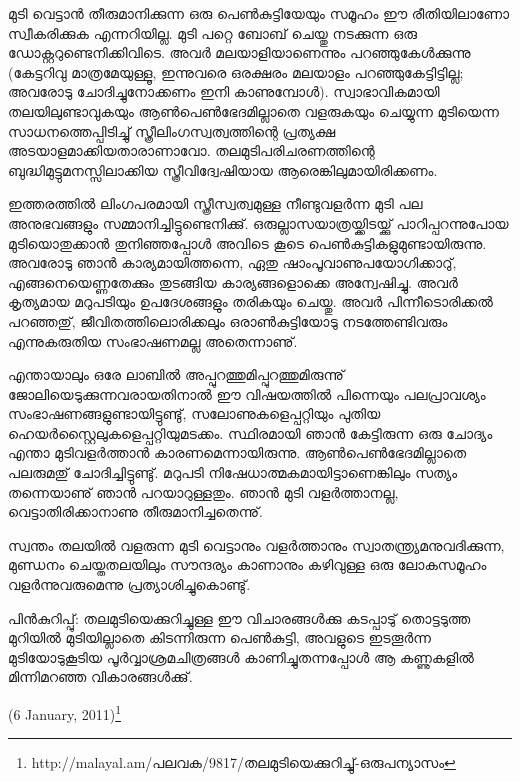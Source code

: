 മുടി വെട്ടാന്‍ തീരുമാനിക്കുന്ന ഒരു പെണ്‍കുട്ടിയേയും സമൂഹം ഈ രീതിയിലാണോ സ്വീകരിക്കുക എന്നറിയില്ല. മുടി പറ്റെ 
ബോബ് ചെയ്തു നടക്കുന്ന ഒരു ഡോക്റ്ററുണ്ടെനിക്കിവിടെ. അവര്‍ മലയാളിയാണെന്നും പറഞ്ഞുകേള്‍ക്കുന്നു (കേട്ടറിവു മാത്രമേയുള്ളൂ, 
ഇന്നുവരെ ഒരക്ഷരം മലയാളം പറഞ്ഞുകേട്ടിട്ടില്ല; അവരോടു ചോദിച്ചുനോക്കണം ഇനി കാണുമ്പോള്‍). സ്വാഭാവികമായി 
തലയിലുണ്ടാവുകയും ആണ്‍പെണ്‍ഭേദമില്ലാതെ വളരുകയും ചെയ്യുന്ന മുടിയെന്ന സാധനത്തെപ്പിടിച്ചു് 
സ്ത്രീലിംഗസ്വത്വത്തിന്റെ പ്രത്യക്ഷ അടയാളമാക്കിയതാരാണാവോ. തലമുടിപരിചരണത്തിന്റെ ബുദ്ധിമുട്ടുമനസ്സിലാക്കിയ സ്ത്രീവിദ്വേഷിയായ ആരെങ്കിലുമായിരിക്കണം.

ഇത്തരത്തില്‍ ലിംഗപരമായി സ്ത്രീസ്വത്വമുള്ള നീണ്ടുവളര്‍ന്ന മുടി പല അനുഭവങ്ങളും സമ്മാനിച്ചിട്ടുണ്ടെനിക്കു്. 
ഒരുല്ലാസയാത്രയ്ക്കിടയ്ക്കു് പാറിപ്പറന്നുപോയ മുടിയൊതുക്കാന്‍ തുനിഞ്ഞപ്പോള്‍ അവിടെ കൂടെ 
പെണ്‍കുട്ടികളുമുണ്ടായിരുന്നു. അവരോടു ഞാന്‍ കാര്യമായിത്തന്നെ, ഏതു ഷാംപൂവാണുപയോഗിക്കാറു്, എങ്ങനെയെണ്ണതേക്കും 
തുടങ്ങിയ കാര്യങ്ങളൊക്കെ അന്വേഷിച്ചു. അവര്‍ കൃത്യമായ മറുപടിയും ഉപദേശങ്ങളും തരികയും ചെയ്തു. അവര്‍ പിന്നീടൊരിക്കല്‍ പറഞ്ഞതു്, 
ജീവിതത്തിലൊരിക്കലും ഒരാണ്‍കുട്ടിയോടു നടത്തേണ്ടിവരും എന്നുകരുതിയ സംഭാഷണമല്ല അതെന്നാണു്.

എന്തായാലും ഒരേ ലാബില്‍ അപ്പുറത്തുമിപ്പുറത്തുമിരുന്നു് ജോലിയെടുക്കുന്നവരായതിനാല്‍ ഈ വിഷയത്തില്‍ പിന്നെയും 
പലപ്രാവശ്യം സംഭാഷണങ്ങളുണ്ടായിട്ടുണ്ടു്, സലോണുകളെപ്പറ്റിയും പുതിയ ഹെയര്‍സ്റ്റൈലുകളെപ്പറ്റിയുമടക്കം. 
സ്ഥിരമായി ഞാന്‍ കേട്ടിരുന്ന ഒരു ചോദ്യം എന്താ മുടിവളര്‍ത്താന്‍ കാരണമെന്നായിരുന്നു. ആണ്‍പെണ്‍ഭേദമില്ലാതെ 
പലരുമതു് ചോദിച്ചിട്ടുണ്ടു്. മറുപടി നിഷേധാത്മകമായിട്ടാണെങ്കിലും സത്യം തന്നെയാണു് ഞാന്‍ പറയാറുള്ളതും. ഞാന്‍ മുടി 
വളര്‍ത്താനല്ല, വെട്ടാതിരിക്കാനാണു തീരുമാനിച്ചതെന്നു്.

സ്വന്തം തലയില്‍ വളരുന്ന മുടി വെട്ടാനും വളര്‍ത്താനും സ്വാതന്ത്ര്യമനുവദിക്കുന്ന, മുണ്ഡനം ചെയ്തതലയിലും 
സൗന്ദര്യം കാണാനും കഴിവുള്ള ഒരു ലോകസമൂഹം വളര്‍ന്നുവരുമെന്നു പ്രത്യാശിച്ചുകൊണ്ടു്.

പിന്‍കുറിപ്പു്: തലമുടിയെക്കുറിച്ചുള്ള ഈ വിചാരങ്ങള്‍ക്കു കടപ്പാടു് തൊട്ടടുത്ത മുറിയില്‍ മുടിയില്ലാതെ കിടന്നിരുന്ന പെണ്‍കുട്ടി, അവളുടെ ഇടതൂര്‍ന്ന മുടിയോടുകൂടിയ പൂര്‍വ്വാശ്രമചിത്രങ്ങള്‍ കാണിച്ചുതന്നപ്പോള്‍ ആ കണ്ണുകളില്‍ മിന്നിമറഞ്ഞ വികാരങ്ങള്‍ക്കു്.
\begin{flushright}(6 January, 2011)\footnote{http://malayal.am/പലവക/9817/തലമുടിയെക്കുറിച്ചു്-ഒരുപന്യാസം}\end{flushright}
\newpage
\setlength{\parskip}{5pt plus 1pt minus 1pt} %
